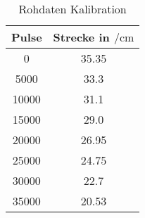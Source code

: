 \begin{table}[H]
    \centering
    \caption{Rohdaten Kalibration}

    \begin{tabular}{| c | c |}
      Pulse & Strecke in $\si{\per \centi \metre}$ \\
                              \hline
                              0 &	35.35 \\
                           5000 &	33.3 \\
                           10000 &	31.1 \\
                           15000 &	29.0 \\
                           20000 &	26.95 \\
                          25000 &	24.75 \\
                          30000 &	22.7 \\
                           35000 &	20.53 \\
                           \hline
    \end{tabular}
\end{table}

